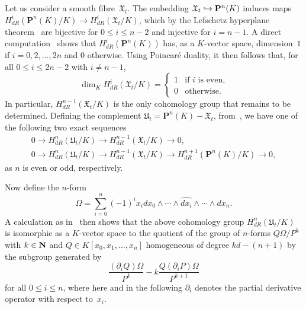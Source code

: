 Let us consider a smooth fibre~$\mathfrak{X}_t$.  The embedding 
$\mathfrak{X}_t \hookrightarrow \mathbf{P}^n(K)$ induces maps 
$H_{dR}^i(\mathbf{P}^n(K)/K) \to H_{dR}^i(\mathfrak{X}_t/K)$, which 
by the Lefschetz hyperplane theorem~\citep[\S 1.2, p.\ 156]{GriffithsHarris1978} 
are bijective for $0 \leq i \leq n-2$ and injective for $i = n-1$.  A direct 
computation~\citep[Corollary~3.1.4]{AbbottKedlayaRoe2006} shows that 
$H_{dR}^i(\mathbf{P}^n(K))$ has, as a $K$-vector space, dimension~$1$ if 
$i = 0, 2, \dotsc, 2n$ and $0$ otherwise.  Using Poincar\'e duality, it then 
follows that, for all $0 \leq i \leq 2n-2$ with $i \neq n-1$, 
\begin{equation}
\dim_K H_{dR}^i(\mathfrak{X}_t/K) = \begin{cases} 1 & \text{if $i$ is even,} \\ 
                                    0 & \text{otherwise.} \end{cases}
\end{equation}
In particular, $H_{dR}^{n-1}(\mathfrak{X}_t/K)$ is the only 
cohomology group that remains to be determined.  Defining the complement 
$\mathfrak{U}_t = \mathbf{P}^n(K) - \mathfrak{X}_t$, 
from~\citep[(10.16)]{Griffiths1969}, we have one of the following two exact 
sequences
\begin{gather}
0 \to H_{dR}^n(\mathfrak{U}_t/K) \to H_{dR}^{n-1}(\mathfrak{X}_t/K) \to 0, \\
0 \to H_{dR}^n(\mathfrak{U}_t/K) \to H_{dR}^{n-1}(\mathfrak{X}_t/K) \to H_{dR}^{n+1}(\mathbf{P}^n(K)/K) \to 0,
\end{gather}
as $n$ is even or odd, respectively.

Now define the $n$-form 
\begin{equation}
\Omega = \sum_{i=0}^n (-1)^i x_i d x_0 \wedge \dotsb \wedge \widehat{d x_i} \wedge \dotsb \wedge d x_n.
\end{equation}
A calculation as in~\citep[\S 4]{Griffiths1969} then shows that the 
above cohomology group $H_{dR}^n(\mathfrak{U}_t/K)$ is isomorphic as a 
$K$-vector space to the quotient of the group of $n$-forms $Q \Omega / P^k$ 
with $k \in \mathbf{N}$ and $Q \in K[x_0, x_1, \dotsc, x_n]$ homogeneous of degree 
$k d - (n + 1)$ by the subgroup generated by 
\begin{equation} \label{eq:PoleReductionQuotient}
\frac{(\partial_i Q) \Omega}{P^k} - k \frac{Q (\partial_i P) \Omega}{P^{k+1}}
\end{equation}
for all $0 \leq i \leq n$, where here and in the following $\partial_i$ 
denotes the partial derivative operator with respect to~$x_i$.


